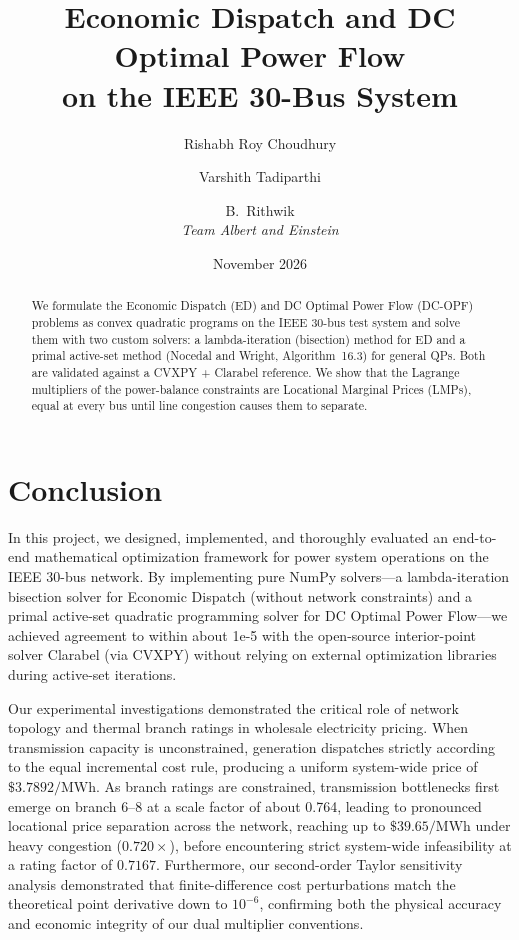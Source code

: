 \documentclass[11pt,a4paper]{article}
\title{Economic Dispatch and DC Optimal Power Flow\\on the IEEE 30-Bus System}
\author{%
  Rishabh Roy Choudhury \and
  Varshith Tadiparthi \and
  B.~Rithwik\\[4pt]
  \textit{Team Albert and Einstein}
}
\date{November 2026}
\begin{document}
\maketitle

\begin{abstract}
We formulate the Economic Dispatch (ED) and DC Optimal Power Flow (DC-OPF)
problems as convex quadratic programs on the IEEE 30-bus test system and solve
them with two custom solvers: a lambda-iteration (bisection) method for ED and
a primal active-set method (Nocedal and Wright, Algorithm~16.3) for general QPs.
Both are validated against a CVXPY + Clarabel reference. We show that the
Lagrange multipliers of the power-balance constraints are Locational Marginal
Prices (LMPs), equal at every bus until line congestion causes them to separate.
\end{abstract}







\section{Conclusion}
In this project, we designed, implemented, and thoroughly evaluated an end-to-end mathematical optimization framework for power system operations on the IEEE 30-bus network. By implementing pure NumPy solvers---a lambda-iteration bisection solver for Economic Dispatch (without network constraints) and a primal active-set quadratic programming solver for DC Optimal Power Flow---we achieved agreement to within about 1e-5 with the open-source interior-point solver Clarabel (via CVXPY) without relying on external optimization libraries during active-set iterations.

Our experimental investigations demonstrated the critical role of network topology and thermal branch ratings in wholesale electricity pricing. When transmission capacity is unconstrained, generation dispatches strictly according to the equal incremental cost rule, producing a uniform system-wide price of $\$3.7892\text{/MWh}$. As branch ratings are constrained, transmission bottlenecks first emerge on branch 6--8 at a scale factor of about 0.764, leading to pronounced locational price separation across the network, reaching up to $\$39.65\text{/MWh}$ under heavy congestion ($0.720\times$), before encountering strict system-wide infeasibility at a rating factor of $0.7167$. Furthermore, our second-order Taylor sensitivity analysis demonstrated that finite-difference cost perturbations match the theoretical point derivative down to $10^{-6}$, confirming both the physical accuracy and economic integrity of our dual multiplier conventions.
\end{document}
